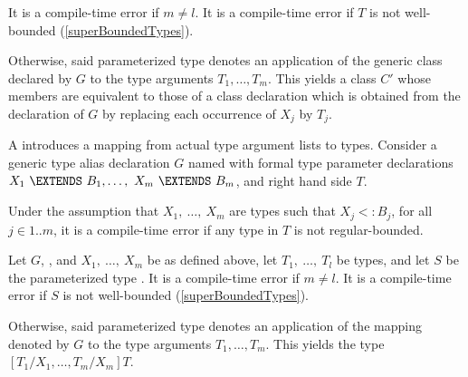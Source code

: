 \documentclass[makeidx]{article}
\begin{document}
\LMHash{}%
It is a compile-time error if $m \not= l$.
It is a compile-time error if $T$ is not well-bounded
(\ref{superBoundedTypes}).

\LMHash{}%
Otherwise, said parameterized type  denotes an application of the generic class declared by $G$ to the type arguments $T_1, \ldots, T_m$.
This yields a class $C'$ whose members are equivalent to those of a class declaration which is obtained from the declaration of $G$ by replacing each occurrence of $X_j$ by $T_j$.

\LMHash{}%
A 
introduces a mapping from actual type argument lists to types.
Consider a generic type alias declaration $G$ named 
with formal type parameter declarations
$X_1\ \EXTENDS\ B_1, \ldots,\ X_m\ \EXTENDS\ B_m$,
and right hand side $T$.

\LMHash{}%
Under the assumption that $X_1,\ \ldots,\ X_m$ are types such that
$X_j <: B_j$, for all $j \in 1 .. m$,
it is a compile-time error if any type in $T$ is not regular-bounded.


\LMHash{}%
Let $G$, , and $X_1,\ \ldots,\ X_m$ be as defined above,
let $T_1,\ \ldots,\ T_l$ be types,
and let $S$ be the parameterized type .
It is a compile-time error if $m \not= l$.
It is a compile-time error if $S$ is not well-bounded
(\ref{superBoundedTypes}).

\LMHash{}%
Otherwise, said parameterized type
denotes an application of the mapping denoted by $G$ to the type arguments
$T_1, \ldots, T_m$.
This yields the type
$[T_1/X_1, \ldots, T_m/X_m]T$.

\end{document}

